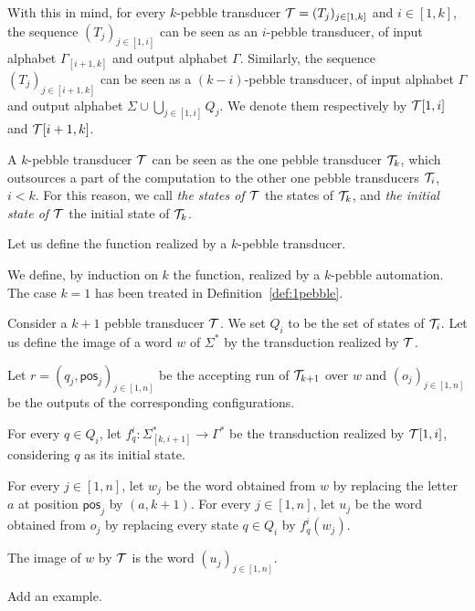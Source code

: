 With this in mind, for every $k$-pebble transducer ${\mathcal T}=(T_j)_{j\in[1,k]}$ and $i\in[1,k]$,  the sequence $(T_j)_{j\in[1,i]}$ can be seen as an $i$-pebble transducer, of input alphabet $\Gamma_{[i+1,k]}$ and output alphabet $\Gamma$. Similarly, the sequence   $(T_j)_{j\in[i+1,k]}$ can be seen as a $(k-i)$-pebble transducer, of input alphabet $\Gamma$ and output alphabet $\Sigma\cup\bigcup_{j\in[1,i]} Q_j$. We denote them respectively by ${\mathcal T}[1,i]$ and ${\mathcal T}[i+1,k]$. 
 
 \medskip
\begin{terminology} 
 A $k$-pebble transducer ${\mathcal T}$ can be seen as the one pebble transducer ${\mathcal T}_k$, which outsources a part of the computation to the other one pebble transducers ${\mathcal T}_i$, $i<k$. 
 For this reason, we call \emph{the states of ${\mathcal T}$} the states of ${\mathcal T}_k$, and \emph{the initial state of ${\mathcal T}$} the initial state of ${\mathcal T}_k$. 
  \end{terminology}
  
  \smallskip
 Let us define the function realized by a $k$-pebble transducer. 
  
  \begin{definition}
We define, by induction on $k$ the function, realized by a $k$-pebble automation. The case $k=1$ has been treated in Definition~\ref{def:1pebble}. 

Consider a $k+1$ pebble transducer ${\mathcal T}$. We set $Q_i$ to be the set of states of ${\mathcal T}_i$.
Let us define the image of a word $w$ of $\Sigma^*$ by the transduction realized by ${\mathcal T}$.

\noindent Let $r=(q_j,\mathsf{pos}_j)_{j\in[1, n]}$ be the accepting run of ${\mathcal T}_{k+1}$ over $w$ and $(o_j)_{j\in[1, n]}$ be the outputs of the corresponding configurations.

\noindent For every $q\in Q_i$, let $f^i_q:\Sigma_{[k,i+1]}^*\rightarrow \Gamma^*$ be the transduction realized by ${\mathcal T}[1,i]$, considering $q$ as its initial state.
 
 For every $j\in[1,n]$, let $w_j$ be the word obtained from $w$ by replacing the letter $a$ at position $\mathsf{pos}_j$ by $(a,k+1)$.
    For every $j\in[1,n]$, let $u_j$ be the word obtained from $o_j$ by replacing every state $q\in Q_i$ by $f^i_q(w_j)$.
    
The image of $w$ by ${\mathcal T}$ is the word $(u_j)_{j\in[1,n]}$.
\end{definition}

\begin{example}
\begin{center}
Add an example.
\end{center}
\end{example}



